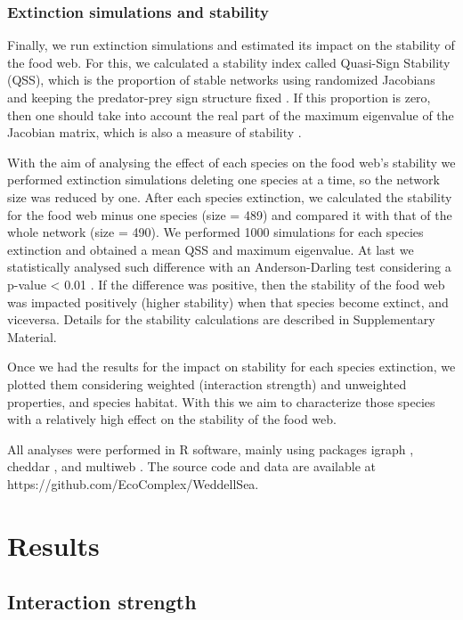 \documentclass[gc, manuscript]{copernicus}
\begin{document}
\subsubsection{Extinction simulations and stability}

Finally, we run extinction simulations and estimated its impact on the
stability of the food web. For this, we calculated a stability index
called Quasi-Sign Stability (QSS), which is the proportion of stable
networks using randomized Jacobians and keeping the predator-prey sign
structure fixed \citep{Allesina2008}. If this proportion is zero, then
one should take into account the real part of the maximum eigenvalue of
the Jacobian matrix, which is also a measure of stability
\citep{Grilli2016}.

With the aim of analysing the effect of each species on the food web's
stability we performed extinction simulations deleting one species at a
time, so the network size was reduced by one. After each species
extinction, we calculated the stability for the food web minus one
species (size = 489) and compared it with that of the whole network
(size = 490). We performed 1000 simulations for each species extinction
and obtained a mean QSS and maximum eigenvalue. At last we statistically
analysed such difference with an Anderson-Darling test considering a
p-value \textless{} 0.01 \citep{Scholz1987}. If the difference was
positive, then the stability of the food web was impacted positively
(higher stability) when that species become extinct, and viceversa.
Details for the stability calculations are described in Supplementary
Material.

Once we had the results for the impact on stability for each species
extinction, we plotted them considering weighted (interaction strength)
and unweighted properties, and species habitat. With this we aim to
characterize those species with a relatively high effect on the
stability of the food web.

All analyses were performed in R software, mainly using packages igraph
\citep{Csardi2005}, cheddar \citep{Hudson2013}, and multiweb
\citep{Saravia2019}. The source code and data are available at
https://github.com/EcoComplex/WeddellSea.

\section{Results}

\subsection{Interaction strength}
\end{document}

